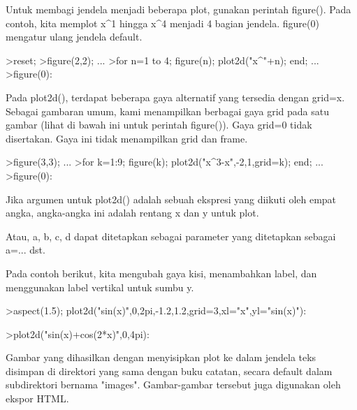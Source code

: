 \documentclass[12pt,Times new roman,letterpaper]{book}
\begin{document}
\begin{eulernootebook}
\begin{eulercomment}
\begin{eulercomment}
\begin{eulernootebook}
\begin{eulercomment}
\begin{eulercomment}
\begin{eulercomment}
\begin{eulercomment}
\begin{eulercomment}
\begin{eulercomment}
\begin{eulercomment}
\begin{eulernotebook}
\begin{eulercomment}
\begin{eulercomment}
\begin{eulercomment}
Untuk membagi jendela menjadi beberapa plot, gunakan perintah
figure(). Pada contoh, kita memplot x\textasciicircum{}1 hingga x\textasciicircum{}4 menjadi 4 bagian
jendela. figure(0) mengatur ulang jendela default.
\end{eulercomment}
\begin{eulerprompt}
>reset;
>figure(2,2); ...
>for n=1 to 4; figure(n); plot2d("x^"+n); end; ...
>figure(0):
\end{eulerprompt}
\begin{eulercomment}
Pada plot2d(), terdapat beberapa gaya alternatif yang tersedia dengan
grid=x. Sebagai gambaran umum, kami menampilkan berbagai gaya grid
pada satu gambar (lihat di bawah ini untuk perintah figure()). Gaya
grid=0 tidak disertakan. Gaya ini tidak menampilkan grid dan frame.
\end{eulercomment}
\begin{eulerprompt}
>figure(3,3); ...
>for k=1:9; figure(k); plot2d("x^3-x",-2,1,grid=k); end; ...
>figure(0):
\end{eulerprompt}
\begin{eulercomment}
Jika argumen untuk plot2d() adalah sebuah ekspresi yang diikuti oleh
empat angka, angka-angka ini adalah rentang x dan y untuk plot.

Atau, a, b, c, d dapat ditetapkan sebagai parameter yang ditetapkan
sebagai a=... dst.

Pada contoh berikut, kita mengubah gaya kisi, menambahkan label, dan
menggunakan label vertikal untuk sumbu y.
\end{eulercomment}
\begin{eulerprompt}
>aspect(1.5); plot2d("sin(x)",0,2pi,-1.2,1.2,grid=3,xl="x",yl="sin(x)"):
\end{eulerprompt}
\begin{eulerprompt}
>plot2d("sin(x)+cos(2*x)",0,4pi):
\end{eulerprompt}
\begin{eulercomment}
Gambar yang dihasilkan dengan menyisipkan plot ke dalam jendela teks
disimpan di direktori yang sama dengan buku catatan, secara default
dalam subdirektori bernama "images". Gambar-gambar tersebut juga
digunakan oleh ekspor HTML.


\end{eulercomment}
\end{eulercomment}
\end{eulercomment}
\end{eulernotebook}
\end{eulercomment}
\end{eulercomment}
\end{eulercomment}
\end{eulercomment}
\end{eulercomment}
\end{eulercomment}
\end{eulercomment}
\end{eulernootebook}
\end{eulercomment}
\end{eulercomment}
\end{eulernootebook}
\end{document}
